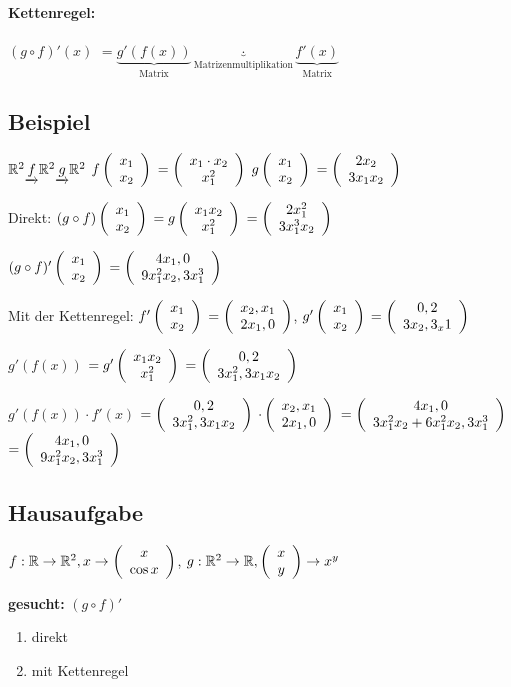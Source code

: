 \paragraph{Kettenregel:}
$(g\circ f)'(x)$
$=\underbrace{g'(f(x))}_{\textrm{Matrix}} \underbrace{\cdot}_{\textrm{Matrizenmultiplikation}} \underbrace{f'(x)}_{\textrm{Matrix}}$

\subsection{Beispiel}
$\R^2 \underrightarrow{f} \R^2 \underrightarrow{g} \R^2$
$f\vektor{x_1\\x_2}$
$=\vektor{x_1 \cdot x_2\\ x_1^2}$
$g\vektor{x_1\\ x_2}$
$=\vektor{2 x_2\\ 3 x_1 x_2}$

Direkt:
$(g\circ f)\vektor{x_1 \\ x_2}$
$= g\vektor{x_1 x_2 \\ x_1^2}$
$= \vektor{2 x_1^2\\ 3 x_1^3 x_2}$

$(g\circ f)'\vektor{x_1 \\ x_2}$
$= \vektor{4 x_1, 0\\ 9 x_1^2 x_2, 3 x_1^3}$

Mit der Kettenregel: 
$f'\vektor{x_1 \\ x_2} $
$=\vektor{x_2, x_1\\ 2 x_1, 0}$,
$g'\vektor{x_1 \\ x_2}$
$=\vektor{0, 2\\3 x_2, 3_x1}$

$g'(f(x)) $
$= g' \vektor{x_1 x_2 \\ x_1^2}$
$= \vektor{0, 2 \\ 3 x_1^2, 3 x_1 x_2}$

$g'(f(x)) \cdot f'(x) $
$=\vektor{0, 2 \\ 3 x_1^2, 3 x_1 x_2}$
$\cdot \vektor{x_2, x_1 \\ 2 x_1, 0}$
$= \vektor{4 x_1, 0 \\ 3 x_1^2 x_2 + 6 x_1^2 x_2, 3 x_1^3}$
$=\vektor{4 x_1, 0 \\ 9 x_1^2 x_2, 3 x_1^3}$

\subsection{Hausaufgabe}
$ f: \R \rightarrow \R^2, x \rightarrow \vektor{x \\ \cos x}$, 
$ g: \R^2 \rightarrow \R, \vektor{x\\y}\rightarrow x^y$

\textbf{gesucht:} $(g\circ f)'$
\begin{enumerate}
\item direkt
\item mit Kettenregel
\end{enumerate}
